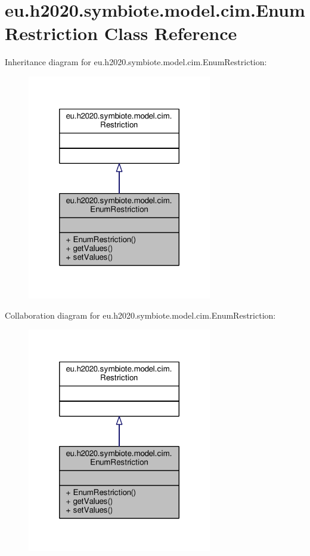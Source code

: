 \hypertarget{classeu_1_1h2020_1_1symbiote_1_1model_1_1cim_1_1EnumRestriction}{}\section{eu.\+h2020.\+symbiote.\+model.\+cim.\+Enum\+Restriction Class Reference}
\label{classeu_1_1h2020_1_1symbiote_1_1model_1_1cim_1_1EnumRestriction}


Inheritance diagram for eu.\+h2020.\+symbiote.\+model.\+cim.\+Enum\+Restriction\+:\nopagebreak
\begin{figure}[H]
\begin{center}
\leavevmode
\includegraphics[width=228pt]{classeu_1_1h2020_1_1symbiote_1_1model_1_1cim_1_1EnumRestriction__inherit__graph}
\end{center}
\end{figure}


Collaboration diagram for eu.\+h2020.\+symbiote.\+model.\+cim.\+Enum\+Restriction\+:\nopagebreak
\begin{figure}[H]
\begin{center}
\leavevmode
\includegraphics[width=228pt]{classeu_1_1h2020_1_1symbiote_1_1model_1_1cim_1_1EnumRestriction__coll__graph}
\end{center}
\end{figure}
